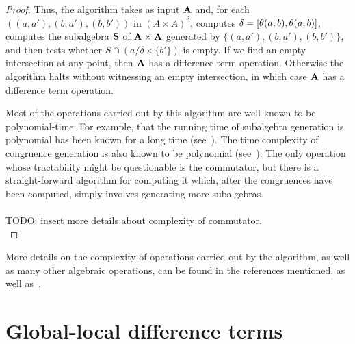 \begin{proof}
    Thus, the algorithm takes as input $\mathbf{A}$ and, for each 
    $((a,a'), (b,a'), (b,b'))$ in $(A\times A)^3$, computes
    $\delta = [\theta(a,b), \theta(a,b)]$, computes the subalgebra
    $\mathbf{S}$ of $\mathbf{A}\times \mathbf{A}$ generated by
    $\{(a,a'), (b,a'), (b,b')\}$, and then
    tests whether $S \cap (a/\delta \times \{b'\})$ is empty.
    If we find an empty intersection at any point, then
    $\mathbf{A}$ has a difference term operation.
    Otherwise the algorithm halts without witnessing an empty
    intersection, in which case $\mathbf{A}$ has a difference term operation.

    Most of the operations carried out by this algorithm are well known to be
    polynomial-time.  For example, that the running time of subalgebra generation is
    polynomial has been known for a long time (see~\cite{MR0455543}).
    The time complexity of congruence generation is also known to be polynomial
    (see~\cite{MR2470585}).  The only operation whose tractability might be 
    questionable is the commutator, but there is a straight-forward algorithm for
    computing it which, after the congruences have been computed, simply
    involves generating more subalgebras.
    \\\\
    TODO: insert more details about complexity of commutator.\\
\end{proof}


More details on the complexity of operations carried out by the algorithm, as well as many other algebraic operations, can be found in the references mentioned, as well as~\cite{MR1871085,MR1695293,Freese:2009}. 


\section{Global-local difference terms}





